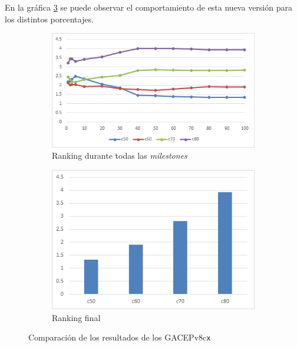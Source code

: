 En la gráfica \ref{fig:GACEPv35} se puede observar el comportamiento de esta nueva versión para los distintos porcentajes.
 
\begin{figure}[h]
     \centering
     \begin{subfigure}[b]{0.45\textwidth}
         \centering
         \includegraphics[width=\textwidth]{imagenes/Experimental/GACEPv35.png}
         \caption{Ranking durante todas las \textit{milestones}}
         \label{fig:GACEPv35_lineas}
     \end{subfigure}
     \hfill
     \begin{subfigure}[b]{0.45\textwidth}
         \centering
         \includegraphics[width=\textwidth]{imagenes/Experimental/barras/GACEPv35.png}
         \caption{Ranking final}
         \label{fig:GACEPv35_barras}
     \end{subfigure}
        \caption{Comparación de los resultados de los GACEPv8c\texttt{x}}
        \label{fig:GACEPv35}
\end{figure}

